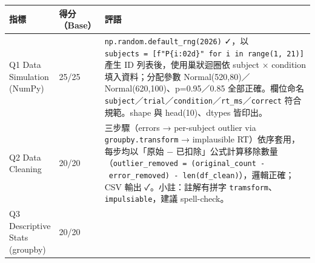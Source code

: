 \documentclass[
  14pt,
]{extarticle}
\begin{document}
\begin{longtable}[]{@{}lll@{}}
\toprule
\begin{minipage}[b]{0.10\columnwidth}\raggedright
指標\strut
\end{minipage} & \begin{minipage}[b]{0.04\columnwidth}\raggedright
得分（Base）\strut
\end{minipage} & \begin{minipage}[b]{0.78\columnwidth}\raggedright
評語\strut
\end{minipage}\tabularnewline
\midrule
\endhead
\begin{minipage}[t]{0.10\columnwidth}\raggedright
Q1 Data Simulation (NumPy)\strut
\end{minipage} & \begin{minipage}[t]{0.04\columnwidth}\raggedright
25/25\strut
\end{minipage} & \begin{minipage}[t]{0.78\columnwidth}\raggedright
\texttt{np.random.default\_rng(2026)} ✓，以
\texttt{subjects\ =\ {[}f"P\{i:02d\}"\ for\ i\ in\ range(1,\ 21){]}}
產生 ID 列表後，使用巢狀迴圈依 subject × condition 填入資料；分配參數
Normal(520,80)／Normal(620,100)、p=0.95／0.85 全部正確。欄位命名
\texttt{subject}／\texttt{trial}／\texttt{condition}／\texttt{rt\_ms}／\texttt{correct}
符合規範。shape 與 head(10)、dtypes 皆印出。\strut
\end{minipage}\tabularnewline
\begin{minipage}[t]{0.10\columnwidth}\raggedright
Q2 Data Cleaning\strut
\end{minipage} & \begin{minipage}[t]{0.04\columnwidth}\raggedright
20/20\strut
\end{minipage} & \begin{minipage}[t]{0.78\columnwidth}\raggedright
三步驟（errors → per-subject outlier via \texttt{groupby.transform} →
implausible RT）依序套用，每步均以「原始 −
已扣除」公式計算移除數量（\texttt{outlier\_removed\ =\ (original\_count\ -\ error\_removed)\ -\ len(df\_clean)}），邏輯正確；CSV
輸出 ✓。小註：註解有拼字 \texttt{tramsform}、\texttt{impulsiable}，建議
spell-check。\strut
\end{minipage}\tabularnewline
\begin{minipage}[t]{0.10\columnwidth}\raggedright
Q3 Descriptive Stats (groupby)\strut
\end{minipage} & \begin{minipage}[t]{0.04\columnwidth}\raggedright
20/20\strut
\end{minipage} & \begin{minipage}[t]{0.78\columnwidth}\raggedright

\end{minipage}
\end{longtable}
\end{document}
